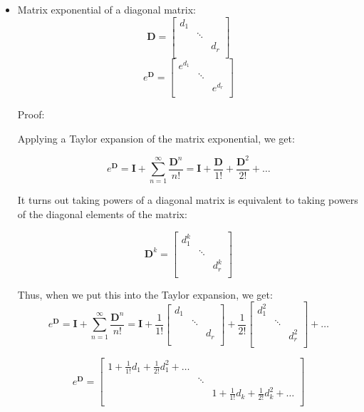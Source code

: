 \documentclass{report}
\begin{document}
{\begin{itemize}
    
    \item Matrix exponential of a diagonal matrix:
    $$
    \mathbf{D} = 
    \begin{bmatrix}
        d_{1} & & \\
        & \ddots & \\
        & & d_{r} \\
    \end{bmatrix}
    $$
    $$
    e^{\mathbf{D}} = 
    \begin{bmatrix}
        e^{d_{1}} & & \\
        & \ddots & \\
        & & e^{d_{r}} \\
    \end{bmatrix}
    $$
    
    Proof:
    
    Applying a Taylor expansion of the matrix exponential, we get:
    
    $$e^{\mathbf{D}} = \mathbf{I} + \sum_{n=1}^\infty \frac{{\mathbf{D}}^n}{n!} = \mathbf{I} + \frac{\mathbf{D}}{1!} + \frac{\mathbf{D}^2}{2!} + \dots$$
    
    It turns out taking powers of a diagonal matrix is equivalent to taking powers of the diagonal elements of the matrix:
    
    $$\mathbf{D}^k = 
    \begin{bmatrix}
        d_{1}^k & & \\
        & \ddots & \\
        & & d_{r}^k \\
    \end{bmatrix}
    $$
    
    Thus, when we put this into the Taylor expansion, we get:
    $$e^{\mathbf{D}} = \mathbf{I} + \sum_{n=1}^\infty \frac{{\mathbf{D}}^n}{n!} = \mathbf{I} + \frac{1}{1!}
    \begin{bmatrix}
        d_{1} & & \\
        & \ddots & \\
        & & d_{r}\\
    \end{bmatrix}
    + \frac{1}{2!}
    \begin{bmatrix}
        d_{1}^2 & & \\
        & \ddots & \\
        & & d_{r}^2 \\
    \end{bmatrix}
    + \dots
    $$
    
    $$
    e^{\mathbf{D}} =
    \begin{bmatrix}
        1 + \frac{1}{1!}d_{1}  +  \frac{1}{2!}d_{1}^2 + \dots & & \\
        & \ddots & \\
        & & 1 + \frac{1}{1!}d_{k} + \frac{1}{2!}d_{k}^2 + \dots \\
    \end{bmatrix}
    $$
    

\end{itemize}}
\end{document}
